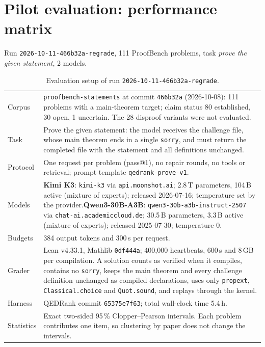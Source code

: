 \documentclass[11pt]{article}
\begin{document}
\section*{Pilot evaluation: performance matrix}
Run \texttt{2026-10-11-466b32a-regrade}, 111 ProofBench problems, task \emph{prove the given statement}, 2 models.

\begin{table}[!htbp]
\centering
\caption{Evaluation setup of run \texttt{2026-10-11-466b32a-regrade}.}
\label{tab:setup}
\small
\begin{tabularx}{\linewidth}{@{}>{\raggedright\arraybackslash}p{2.4cm}>{\raggedright\arraybackslash}X@{}}
\toprule
Corpus & \texttt{proofbench-statements} at commit \texttt{466b32a} (2026-10-08): 111 problems with a main-theorem target; claim status 80 established, 30 open, 1 uncertain. The 28 disproof variants were not evaluated. \\
Task & Prove the given statement: the model receives the challenge file, whose main theorem ends in a single \texttt{sorry}, and must return the completed file with the statement and all definitions unchanged. \\
Protocol & One request per problem (pass@1), no repair rounds, no tools or retrieval; prompt template \texttt{qedrank-prove-v1}. \\
Models & \textbf{Kimi K3}: \texttt{kimi-k3} via \texttt{api.moonshot.ai}; 2.8\,T parameters, 104\,B active (mixture of experts); released 2026-07-16; temperature set by the provider.\newline \textbf{Qwen3-30B-A3B}: \texttt{qwen3-30b-a3b-instruct-2507} via \texttt{chat-ai.academiccloud.de}; 30.5\,B parameters, 3.3\,B active (mixture of experts); released 2025-07-30; temperature 0. \\
Budgets & 16{,}384 output tokens and 300\,s per request. \\
Grader & Lean v4.33.1, Mathlib \texttt{0df444a}; 400{,}000 heartbeats, 600\,s and 8\,GB per compilation. A solution counts as verified when it compiles, contains no \texttt{sorry}, keeps the main theorem and every challenge definition unchanged as compiled declarations, uses only \texttt{propext}, \texttt{Classical.choice} and \texttt{Quot.sound}, and replays through the kernel. \\
Harness & QEDRank commit \texttt{65375e7f63}; total wall-clock time 5.4\,h. \\
Statistics & Exact two-sided 95\,\% Clopper--Pearson intervals. Each problem contributes one item, so clustering by paper does not change the intervals. \\
\bottomrule
\end{tabularx}

\end{table}
\end{document}
